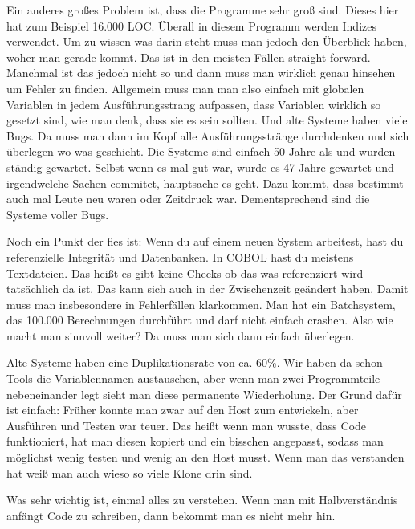 {Ein anderes großes Problem ist, dass die Programme sehr groß sind. Dieses hier hat zum Beispiel 16.000 LOC. Überall in diesem Programm werden Indizes verwendet. Um zu wissen was darin steht muss man jedoch den Überblick haben, woher man gerade kommt. Das ist in den meisten Fällen straight-forward. Manchmal ist das jedoch nicht so und dann muss man wirklich genau hinsehen um Fehler zu finden. Allgemein muss man man also einfach mit globalen Variablen in jedem Ausführungsstrang aufpassen, dass Variablen wirklich so gesetzt sind, wie man denk, dass sie es sein sollten. Und alte Systeme haben viele Bugs. Da muss man dann im Kopf alle Ausführungsstränge durchdenken und sich überlegen wo was geschieht. Die Systeme sind einfach 50 Jahre als und wurden ständig gewartet. Selbst wenn es mal gut war, wurde es 47 Jahre gewartet und irgendwelche Sachen commitet, hauptsache es geht. Dazu kommt, dass bestimmt auch mal Leute neu waren oder \zB Zeitdruck war. Dementsprechend sind die Systeme voller Bugs. 

Noch ein Punkt der fies ist: Wenn du auf einem neuen System arbeitest, hast du referenzielle Integrität und Datenbanken. In COBOL hast du meistens Textdateien. Das heißt es gibt keine Checks ob das was referenziert wird tatsächlich da ist. Das kann sich auch in der Zwischenzeit geändert haben. Damit muss man insbesondere in Fehlerfällen klarkommen. Man hat ein Batchsystem, das 100.000 Berechnungen durchführt und darf nicht einfach crashen. Also wie macht man sinnvoll weiter? Da muss man sich dann einfach überlegen. 

Alte Systeme haben eine Duplikationsrate von ca. 60\%. Wir haben da schon Tools die Variablennamen austauschen, aber wenn man zwei Programmteile nebeneinander legt sieht man diese permanente Wiederholung. Der Grund dafür ist einfach: Früher konnte man zwar auf den Host zum entwickeln, aber Ausführen und Testen war teuer. Das heißt wenn man wusste, dass Code funktioniert, hat man diesen kopiert und ein bisschen angepasst, sodass man möglichst wenig testen und wenig an den Host musst. Wenn man das verstanden hat weiß man auch wieso so viele Klone drin sind. 

Was sehr wichtig ist, einmal alles zu verstehen. Wenn man mit Halbverständnis anfängt Code zu schreiben, dann bekommt man es nicht mehr hin. 
}
